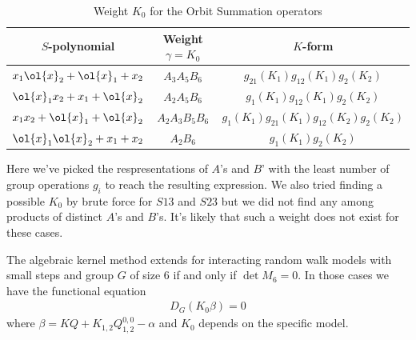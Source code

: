 \begin{table}[H]
    \caption{Weight $K_0$ for the Orbit Summation operators}
    \label{tbl:tableWeight6}
    \centering
   \begin{tabular}{ccc}
    \toprule
    $S$-polynomial & Weight $\gamma = K_0$ & $K$-form \\ 
    \midrule
	$ x_1\ol{x}_2+\ol{x}_1+x_2$  & $A_3 A_5 B_6$ & $ g_{21}(K_1) g_{12}(K_1) g_{2}(K_2)$\\
	$\ol{x}_1x_2 + x_1 + \ol{x}_2$ & $A_2 A_5 B_6$ & $ g_{1}(K_1) g_{12}(K_1) g_{2}(K_2)$\\
	$ x_1 x_2+\ol{x}_1+\ol{x}_2$ & $A_2 A_3 B_5 B_6$ & $g_{1}(K_1) g_{21}(K_1) g_{12}(K_2) g_{2}(K_2)$\\
	$\ol{x}_1\ol{x}_2 + x_1 + x_2$ & $A_2 B_6$ & $g_{1}(K_1) g_{2}(K_2)$\\
    \bottomrule
   \end{tabular}
\end{table}
Here we've picked the respresentations of $A$'s and $B$' with the least number of group operations $g_i$ to reach the resulting expression. We also tried finding a possible $K_0$ by brute force for $S13$ and $S23$ but we did not find any among products of distinct $A$'s and $B$'s. It's likely that such a weight does not exist for these cases.
\begin{theorem} The algebraic kernel method extends for interacting random walk models with small steps and group $G$ of size 6 if and only if $\det M_6 = 0$. In those cases we have the functional equation
\begin{align}
	D_G(K_0 \beta) = 0
\end{align}
where $\beta =  KQ + K_{1,2}Q_{1,2}^{0,0} -\alpha$ and $K_0$ depends on the specific model.
\end{theorem}
